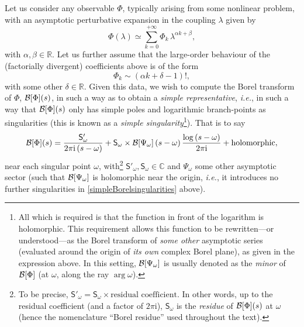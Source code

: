 \documentclass[11pt,a4paper]{article}
\newcommand{\CB}{{\cal B}}
\def\BR{{\mathbb R}}
\def\BC{{\mathbb C}}
\newcommand{\be}{\begin{equation}}
\newcommand{\ee}{\end{equation}}
\newcommand{\rmi}{{\mathrm{i}}}
\begin{document}
Let us consider any observable $\Phi$, typically arising from some nonlinear problem, with an asymptotic perturbative expansion in the coupling $\lambda$ given by
%
\be
\label{simpleasymptoticsequence}
\Phi (\lambda) \simeq \sum_{k=0}^{+\infty} \Phi_k\, \lambda^{\alpha k + \beta},
\ee
%
\noindent
with $\alpha, \beta \in \BR$. Let us further assume that the large-order behaviour of the (factorially divergent) coefficients above is of the form
%
\be
\Phi_k \sim ( \alpha k + \delta - 1 )!,
\ee
%
\noindent
with some other $\delta \in \BR$. Given this data, we wish to compute the Borel transform of $\Phi$, $\CB [\Phi] (s)$, in such a way as to obtain a \textit{simple representative}, \textit{i.e.}, in such a way that $\CB [\Phi] (s)$ only has simple poles and logarithmic branch-points as singularities (this is known as a \textit{simple singularity}\footnote{All which is required is that the function in front of the logarithm is holomorphic. This requirement allows this function to be rewritten---or understood---as the Borel transform of \textit{some other} asymptotic series (evaluated around the origin of \textit{its own} complex Borel plane), as given in the expression above. In this setting, $\CB [\Psi_\omega]$ is usually denoted as the \textit{minor} of $\CB [\Phi]$ (at $\omega$, along the ray $\arg \omega$).}). That is to say
%
\be
\label{simpleBorelsingularities}
\CB [\Phi] (s) = \frac{\mathsf{S}'_\omega}{2\pi\rmi \left( s-\omega \right)} + \mathsf{S}_\omega \times \CB [\Psi_\omega] \left( s-\omega \right) \frac{\log \left( s-\omega \right)}{2\pi\rmi} + \text{holomorphic},
\ee
%
\noindent
near each singular point $\omega$, with\footnote{To be precise, $\mathsf{S}'_\omega = \mathsf{S}_\omega \times \text{residual coefficient}$. In other words, up to the residual coefficient (and a factor of $2\pi\rmi$), $\mathsf{S}_\omega$ is the \textit{residue} of $\CB [\Phi] (s)$ at $\omega$ (hence the nomenclature ``Borel residue'' used throughout the text).} $\mathsf{S}'_\omega, \mathsf{S}_\omega \in \BC$ and $\Psi_\omega$ some other asymptotic sector (such that $\CB [\Psi_\omega]$ is holomorphic near the origin, \textit{i.e.}, it introduces no further singularities in \eqref{simpleBorelsingularities} above).
\end{document}
